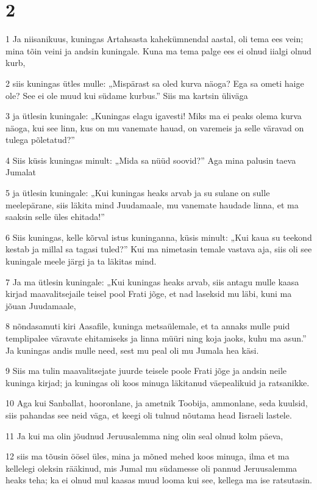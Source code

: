 \chapter{2}

\par 1 Ja niisanikuus, kuningas Artahsasta kahekümnendal aastal, oli tema ees vein; mina tõin veini ja andsin kuningale. Kuna ma tema palge ees ei olnud iialgi olnud kurb,
\par 2 siis kuningas ütles mulle: „Mispärast sa oled kurva näoga? Ega sa ometi haige ole? See ei ole muud kui südame kurbus.” Siis ma kartsin üliväga
\par 3 ja ütlesin kuningale: „Kuningas elagu igavesti! Miks ma ei peaks olema kurva näoga, kui see linn, kus on mu vanemate hauad, on varemeis ja selle väravad on tulega põletatud?”
\par 4 Siis küsis kuningas minult: „Mida sa nüüd soovid?” Aga mina palusin taeva Jumalat
\par 5 ja ütlesin kuningale: „Kui kuningas heaks arvab ja su sulane on sulle meelepärane, siis läkita mind Juudamaale, mu vanemate haudade linna, et ma saaksin selle üles ehitada!”
\par 6 Siis kuningas, kelle kõrval istus kuninganna, küsis minult: „Kui kaua su teekond kestab ja millal sa tagasi tuled?” Kui ma nimetasin temale vastava aja, siis oli see kuningale meele järgi ja ta läkitas mind.
\par 7 Ja ma ütlesin kuningale: „Kui kuningas heaks arvab, siis antagu mulle kaasa kirjad maavalitsejaile teisel pool Frati jõge, et nad laseksid mu läbi, kuni ma jõuan Juudamaale,
\par 8 nõndasamuti kiri Aasafile, kuninga metsaülemale, et ta annaks mulle puid templipalee väravate ehitamiseks ja linna müüri ning koja jaoks, kuhu ma asun.” Ja kuningas andis mulle need, sest mu peal oli mu Jumala hea käsi.
\par 9 Siis ma tulin maavalitsejate juurde teisele poole Frati jõge ja andsin neile kuninga kirjad; ja kuningas oli koos minuga läkitanud väepealikuid ja ratsanikke.
\par 10 Aga kui Sanballat, hooronlane, ja ametnik Toobija, ammonlane, seda kuulsid, siis pahandas see neid väga, et keegi oli tulnud nõutama head Iisraeli lastele.
\par 11 Ja kui ma olin jõudnud Jeruusalemma ning olin seal olnud kolm päeva,
\par 12 siis ma tõusin öösel üles, mina ja mõned mehed koos minuga, ilma et ma kellelegi oleksin rääkinud, mis Jumal mu südamesse oli pannud Jeruusalemma heaks teha; ka ei olnud mul kaasas muud looma kui see, kellega ma ise ratsutasin.
